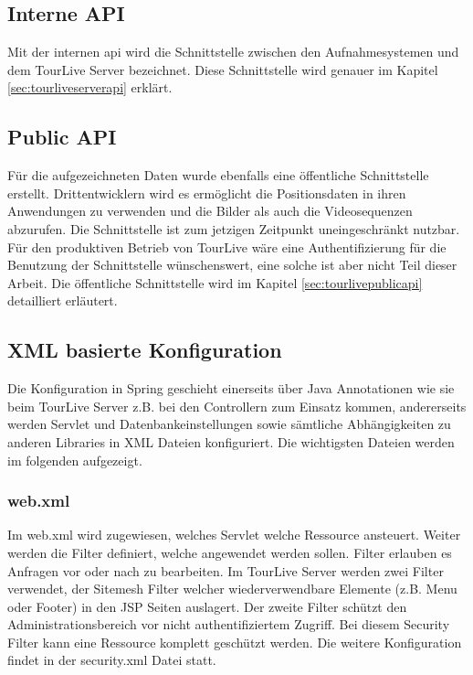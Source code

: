 \subsection{Interne API}
Mit der internen \gls{api} wird die Schnittstelle zwischen den Aufnahmesystemen und dem TourLive Server bezeichnet. Diese Schnittstelle wird genauer im Kapitel \ref{sec:tourliveserverapi} erklärt.

\subsection{Public API}
Für die aufgezeichneten Daten wurde ebenfalls eine öffentliche Schnittstelle erstellt. Drittentwicklern wird es ermöglicht die Positionsdaten in ihren Anwendungen zu verwenden und die Bilder als auch die Videosequenzen abzurufen. Die Schnittstelle ist zum jetzigen Zeitpunkt uneingeschränkt nutzbar. Für den produktiven Betrieb von TourLive wäre eine Authentifizierung für die Benutzung der Schnittstelle wünschenswert, eine solche ist aber nicht Teil dieser Arbeit. Die öffentliche Schnittstelle wird im Kapitel \ref{sec:tourlivepublicapi} detailliert erläutert.

\subsection{XML basierte Konfiguration}
Die Konfiguration in Spring geschieht einerseits über Java Annotationen wie sie beim TourLive Server z.B. bei den Controllern zum Einsatz kommen, andererseits werden Servlet und Datenbankeinstellungen sowie sämtliche Abhängigkeiten zu anderen Libraries in XML Dateien konfiguriert. Die wichtigsten Dateien werden im folgenden aufgezeigt.

\subsubsection{web.xml}
Im web.xml wird zugewiesen, welches Servlet welche Ressource ansteuert. Weiter werden die Filter definiert, welche angewendet werden sollen. Filter erlauben es Anfragen vor oder nach zu bearbeiten. Im TourLive Server werden zwei Filter verwendet, der Sitemesh Filter welcher wiederverwendbare Elemente (z.B. Menu oder Footer) in den JSP Seiten auslagert. Der zweite Filter schützt den Administrationsbereich vor nicht authentifiziertem Zugriff. Bei diesem Security Filter kann eine Ressource komplett geschützt werden. Die weitere Konfiguration findet in der security.xml Datei statt.

